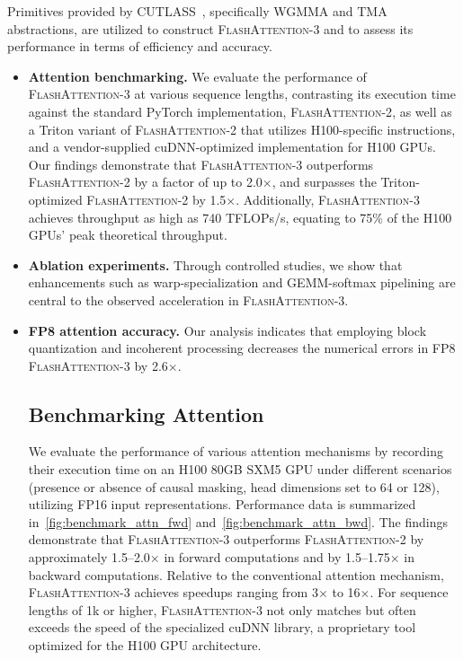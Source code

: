 Primitives provided by CUTLASS~\citep{Thakkar_CUTLASS_2023}, specifically WGMMA and TMA abstractions, are utilized to construct \textsc{FlashAttention-3} and to assess its performance in terms of efficiency and accuracy.

\begin{itemize}

\item \textbf{Attention benchmarking.} We evaluate the performance of \textsc{FlashAttention-3} at various sequence lengths, contrasting its execution time against the standard PyTorch implementation, \textsc{FlashAttention-2}, as well as a Triton variant of \textsc{FlashAttention-2} that utilizes H100-specific instructions, and a vendor-supplied cuDNN-optimized implementation for H100 GPUs. Our findings demonstrate that \textsc{FlashAttention-3} outperforms \textsc{FlashAttention-2} by a factor of up to 2.0$\times$, and surpasses the Triton-optimized \textsc{FlashAttention-2} by 1.5$\times$. Additionally, \textsc{FlashAttention-3} achieves throughput as high as 740 TFLOPs/s, equating to 75\% of the H100 GPUs’ peak theoretical throughput.

\item \textbf{Ablation experiments.} Through controlled studies, we show that enhancements such as warp-specialization and GEMM-softmax pipelining are central to the observed acceleration in \textsc{FlashAttention-3}.

\item \textbf{FP8 attention accuracy.} Our analysis indicates that employing block quantization and incoherent processing decreases the numerical errors in FP8 \textsc{FlashAttention-3} by 2.6$\times$.

\subsection{Benchmarking Attention}
\label{subsec:benchmark_attn}

We evaluate the performance of various attention mechanisms by recording their execution time on an H100 80GB SXM5 GPU under different scenarios (presence or absence of causal masking, head dimensions set to 64 or 128), utilizing FP16 input representations. Performance data is summarized in~\cref{fig:benchmark_attn_fwd} and~\cref{fig:benchmark_attn_bwd}. The findings demonstrate that \textsc{FlashAttention-3} outperforms \textsc{FlashAttention-2} by approximately 1.5–2.0$\times$ in forward computations and by 1.5–1.75$\times$ in backward computations. Relative to the conventional attention mechanism, \textsc{FlashAttention-3} achieves speedups ranging from 3$\times$ to 16$\times$. For sequence lengths of 1k or higher, \textsc{FlashAttention-3} not only matches but often exceeds the speed of the specialized cuDNN library, a proprietary tool optimized for the H100 GPU architecture.


\end{itemize}
